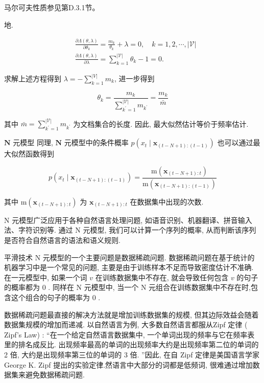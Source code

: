 \documentclass[10pt]{article}
\begin{document}
马尔可夫性质参见第D.3.1节。

地.


\begin{align*}
& \frac{\partial \Lambda(\theta, \lambda)}{\partial \theta_{k}}=\frac{m_{k}}{\theta_{k}}+\lambda=0, \quad k=1,2, \cdots,|\mathcal{V}|  \tag{15.16}\\
& \frac{\partial \Lambda(\theta, \lambda)}{\partial \lambda}=\sum_{k=1}^{|\mathcal{V}|} \theta_{k}-1=0 . \tag{15.17}
\end{align*}


求解上述方程得到 $\lambda=-\sum_{k=1}^{|V|} m_{k}$, 进一步得到


\begin{equation*}
\theta_{k}=\frac{m_{k}}{\sum_{k^{\prime}=1}^{|\mathcal{V}|} m_{k^{\prime}}}=\frac{m_{k}}{\bar{m}} \tag{15.18}
\end{equation*}


其中 $\bar{m}=\sum_{k^{\prime}=1}^{|\mathcal{V}|} m_{k^{\prime}}$ 为文档集合的长度. 因此, 最大似然估计等价于频率估计.

$\mathbf{N}$ 元模型 同理, $\mathbf{N}$ 元模型中的条件概率 $p\left(x_{t} \mid \boldsymbol{x}_{(t-N+1):(t-1)}\right)$ 也可以通过最大似然函数得到


\begin{equation*}
p\left(x_{t} \mid \boldsymbol{x}_{(t-N+1):(t-1)}\right)=\frac{\mathrm{m}\left(\boldsymbol{x}_{(t-N+1): t}\right)}{\mathrm{m}\left(\boldsymbol{x}_{(t-N+1):(t-1)}\right)} \tag{15.19}
\end{equation*}


其中 $\mathrm{m}\left(\boldsymbol{x}_{(t-N+1): t}\right)$ 为 $\boldsymbol{x}_{(t-N+1): t}$ 在数据集中出现的次数.

$\mathrm{N}$ 元模型广泛应用于各种自然语言处理问题, 如语音识别、机器翻译、拼音输入法、字符识别等. 通过 $\mathrm{N}$ 元模型, 我们可以计算一个序列的概率, 从而判断该序列是否符合自然语言的语法和语义规则.

平滑技术 $\mathrm{N}$ 元模型的一个主要问题是数据稀疏问题. 数据稀疏问题在基于统计的机器学习中是一个常见的问题, 主要是由于训练样本不足而导致密度估计不准确. 在一元模型中, 如果一个词 $v$ 在训练数据集中不存在, 就会导致任何包含 $v$ 的句子的概率都为 0 . 同样在 $\mathrm{N}$ 元模型中, 当一个 $\mathrm{N}$ 元组合在训练数据集中不存在时,包含这个组合的句子的概率为 0 .

数据稀疏问题最直接的解决方法就是增加训练数据集的规模, 但其边际效益会随着数据集规模的增加而递减. 以自然语言为例, 大多数自然语言都服从Zipf 定律 ( Zipf's Law) : “在一个给定自然语言数据集中, 一个单词出现的频率与它在频率表里的排名成反比. 出现频率最高的单词的出现频率大约是出现频率第二位的单词的 2 倍, 大约是出现频率第三位的单词的 3 倍. ”因此, 在自 Zipf 定律是美国语言学家 George K. Zipf 提出的实验定律.然语言中大部分的词都是低频词, 很难通过增加数据集来避免数据稀疏问题.
\end{document}
